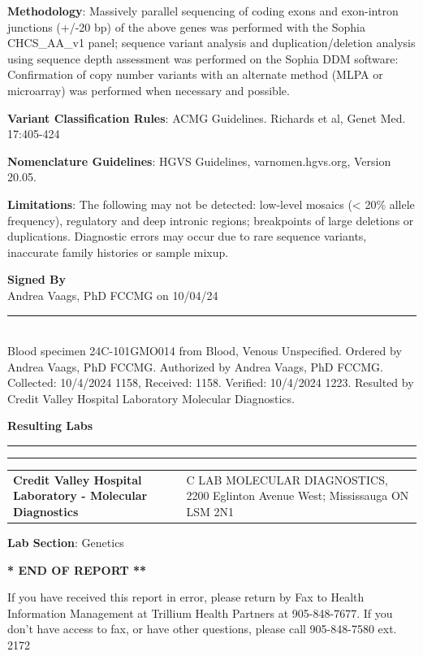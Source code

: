 \documentclass[10pt,letterpaper]{extarticle}
\newcommand{\doublerule}{\rule{\textwidth}{1pt}

\vspace{-2em}%
\rule{\textwidth}{1pt}}
\begin{document}
{\bf Methodology}: Massively parallel sequencing of coding exons and exon-intron junctions (+/-20 bp) of the above genes was performed with the Sophia CHCS\_AA\_v1 panel; sequence variant analysis and duplication/deletion analysis using sequence depth assessment was performed on the Sophia DDM software: Confirmation of copy number variants with an alternate method (MLPA or microarray) was performed when necessary and possible. 

{\bf Variant Classification Rules}: ACMG Guidelines. Richards et al, Genet Med. 17:405-424 

{\bf Nomenclature Guidelines}: HGVS Guidelines, varnomen.hgvs.org, Version 20.05. 

{\bf Limitations}: The following may not be detected: low-level mosaics (< 20\% allele frequency), regulatory and deep intronic regions; breakpoints of large deletions or duplications. Diagnostic errors may occur due to rare sequence variants, inaccurate family histories or sample mixup.

{\bf \large Signed By}\\
Andrea Vaags, PhD FCCMG on 10/04/24

\vspace{2em}
\rule{\textwidth}{1pt}\\
{\small Blood specimen 24C-101GMO014 from Blood, Venous Unspecified. Ordered by Andrea Vaags, PhD FCCMG. Authorized by Andrea Vaags, PhD FCCMG. Collected: 10/4/2024 1158, Received: 1158. Verified: 10/4/2024 1223. Resulted by Credit Valley Hospital Laboratory Molecular Diagnostics.}

\vspace{2em}
{\bf \large Resulting Labs}\\
\doublerule

\begin{tabular}{p{5cm} p{15cm}}
\bf \small Credit Valley Hospital Laboratory - Molecular Diagnostics & \small C LAB MOLECULAR DIAGNOSTICS, 2200 Eglinton Avenue West; Mississauga ON LSM 2N1
\end{tabular}

{\bf Lab Section}: Genetics

\begin{center}
\bf ** END OF REPORT **
\end{center}

\begin{center}
\scriptsize
If you have received this report in error, please return by Fax to Health Information Management at Trillium Health Partners at 905-848-7677. If you don't have access to fax, or have other questions, please call 905-848-7580 ext. 2172
\end{center}
\end{document}
